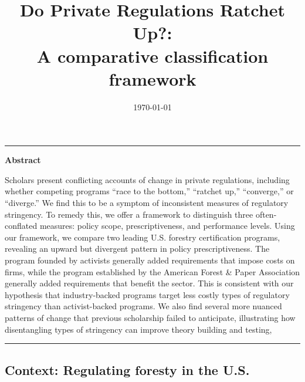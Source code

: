 \documentclass[
      12pt,
        ]{article}
\title{Do Private Regulations Ratchet Up?: 
           \\ A comparative classification framework}
\author{}
\date{\today}
\begin{document}
 


  \maketitle






    \hypersetup{linkcolor = black}
  \setcounter{tocdepth}{2}
  \tableofcontents






\noindent 
    \begin{center}\rule{0.5\linewidth}{\linethickness}\end{center}

\textbf{Abstract}

Scholars present conflicting accounts of change in private regulations,
including whether competing programs ``race to the bottom,'' ``ratchet
up,'' ``converge,'' or ``diverge.'' We find this to be a symptom of
inconsistent measures of regulatory stringency. To remedy this, we offer
a framework to distinguish three often-conflated measures: policy scope,
prescriptiveness, and performance levels. Using our framework, we
compare two leading U.S. forestry certification programs, revealing an
upward but divergent pattern in policy prescriptiveness. The program
founded by activists generally added requirements that impose costs on
firms, while the program established by the American Forest \& Paper
Association generally added requirements that benefit the sector. This
is consistent with our hypothesis that industry-backed programs target
less costly types of regulatory stringency than activist-backed
programs. We also find several more nuanced patterns of change that
previous scholarship failed to anticipate, illustrating how
disentangling types of stringency can improve theory building and
testing,

\begin{center}\rule{0.5\linewidth}{\linethickness}\end{center}

\subsection{Context: Regulating foresty in the
U.S.}\label{context-regulating-foresty-in-the-u.s.}
\end{document}
